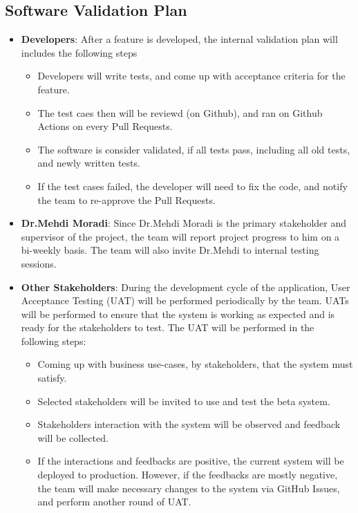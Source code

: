 \documentclass[12pt, titlepage]{article}
\begin{document}
\subsection{Software Validation Plan}
\begin{itemize}
  \item[]{\textbf{Developers}: After a feature is developed, the internal validation plan will includes the following steps}
  \begin{itemize}
    \item{Developers will write tests, and come up with acceptance criteria for the feature.}
    \item{The test caes then will be reviewd (on Github), and ran on Github Actions on every Pull Requests.}
    \item{The software is consider validated, if all tests pass, including all old tests, and newly written tests.}
    \item{If the test cases failed, the developer will need to fix the code, and notify the team to re-approve the Pull Requests.}
  \end{itemize}
  \item[]{\textbf{Dr.Mehdi Moradi}: Since Dr.Mehdi Moradi is the primary stakeholder and supervisor of the project, the team will report project progress to him on a bi-weekly basis. The team will also invite Dr.Mehdi to internal testing sessions.}
  \item[]{\textbf{Other Stakeholders}: During the development cycle of the application, User Acceptance Testing (UAT) will be performed periodically by the team. UATs will be performed to ensure that the system is working as expected and is ready for the stakeholders to test. The UAT will be performed in the following steps:}
  \begin{itemize}
    \item{Coming up with business use-cases, by stakeholders, that the system must satisfy.}
    \item{Selected stakeholders will be invited to use and test the beta system.}
    \item{Stakeholders interaction with the system will be observed and feedback will be collected.}
    \item{If the interactions and feedbacks are positive, the current system will be deployed to production. However, if the feedbacks are mostly negative, the team will make necessary changes to the system via GitHub Issues, and perform another round of UAT.}
  \end{itemize}
\end{itemize}
\end{document}
